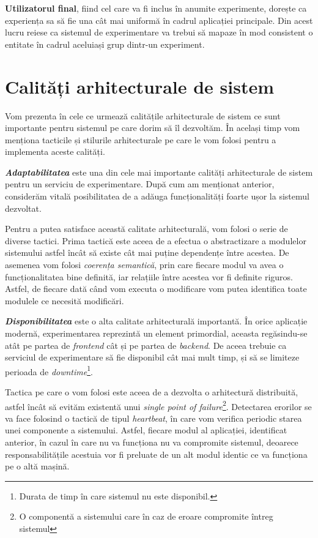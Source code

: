 \textbf{\textbf{Utilizatorul final}}, fiind cel care va fi inclus în anumite experimente, dorește ca experiența sa să fie una cât mai uniformă în cadrul aplicației principale. Din acest lucru reiese ca sistemul de experimentare va trebui să mapaze în mod consistent o entitate în cadrul aceluiași grup dintr-un experiment. 

\section{Calități arhitecturale de sistem}

Vom prezenta în cele ce urmează calitățile arhitecturale de sistem ce sunt importante pentru sistemul pe care dorim să îl dezvoltăm. În același timp vom menționa tacticile și stilurile arhitecturale pe care le vom folosi pentru a implementa aceste calități.

\textbf{\textit{Adaptabilitatea}} este una din cele mai importante calități arhitecturale de sistem pentru un serviciu de experimentare. După cum am menționat anterior, considerăm vitală posibilitatea de a adăuga funcționalități foarte ușor la sistemul dezvoltat.

Pentru a putea satisface această calitate arhitecturală, vom folosi o serie de diverse tactici. Prima tactică este aceea de a efectua o abstractizare a modulelor sistemului astfel încât să existe cât mai puține dependențe între acestea. De asemenea vom folosi \textit{coerența semantică}, prin care fiecare modul va avea o funcționalitatea bine definită, iar relațiile între acestea vor fi definite riguros. Astfel, de fiecare dată când vom executa o modificare vom putea identifica toate modulele ce necesită modificări.

\textbf{\textit{Disponibilitatea}} este o alta calitate arhitecturală importantă. În orice aplicație modernă, experimentarea reprezintă un element primordial, aceasta regăsindu-se atât pe partea de \textit{frontend} cât și pe partea de \textit{backend}. De aceea trebuie ca serviciul de experimentare să fie disponibil cât mai mult timp, și să se limiteze  perioada de \textit{downtime}\footnote{Durata de timp în care sistemul nu este disponibil.}.

Tactica pe care o vom folosi este aceea de a dezvolta o arhitectură distribuită, astfel încât să evităm existentă unui \textit{single point of failure}\footnote{O componentă a sistemului care în caz de eroare compromite întreg sistemul}. Detectarea erorilor se va face folosind o tactică de tipul \textit{heartbeat}, în care vom verifica periodic starea unei componente a sistemului. Astfel, fiecare modul al aplicației, identificat anterior, în cazul în care nu va funcționa nu va compromite sistemul, deoarece responsabilitățile acestuia vor fi preluate de un alt modul identic ce va funcționa pe o altă mașină.


